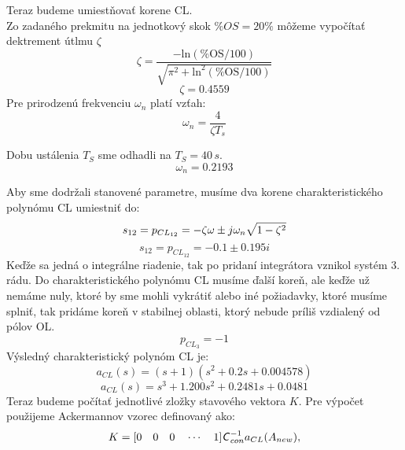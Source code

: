 \documentclass[journal]{IEEEtran}
\begin{document}
Teraz budeme umiestňovať korene CL.\\
Zo zadaného prekmitu na jednotkový skok $\%OS = 20\%$ môžeme vypočítať dektrement útlmu $\zeta$
\begin{equation}\label{eq:1}
	\zeta=\frac{-\mathrm{ln}(\%\mathrm{OS}/100)}{\sqrt{\pi^2+\mathrm{ln}^2(\%\mathrm{OS}/100)}}
\end{equation}
\begin{equation}
	\zeta=0.4559
\end{equation} 
Pre prirodzenú frekvenciu $\omega_n $ platí vzťah:
\begin{equation}
	\omega_n=\frac{4}{\zeta T_s}
\end{equation}

Dobu ustálenia $T_S$ sme odhadli na $T_S=40\,s$.
\begin{equation}
	\omega_n=0.2193
\end{equation}

Aby sme dodržali stanovené parametre, musíme dva korene charakteristického polynómu CL umiestniť do:
\begin{equation}
	s_{12}=p_{{CL}_{12}}=-\zeta\omega \pm j\omega_n\sqrt{1-\zeta^2}\\
\end{equation}
\begin{equation}
s_{12}=p_{{CL}_{12}}=-0.1\pm 0.195i 
\end{equation}
Keďže sa jedná o integrálne riadenie, tak po pridaní integrátora vznikol systém 3. rádu. Do charakteristického polynómu CL musíme ďalší koreň, ale keďže už nemáme nuly, ktoré by sme mohli vykrátiť alebo iné požiadavky, ktoré musíme splniť, tak pridáme koreň v stabilnej oblasti, ktorý nebude príliš vzdialený od pólov OL.
\begin{equation}
	p_{{CL}_{3}}=- 1
\end{equation}
Výsledný charakteristický polynóm CL je:
\begin{equation}
	a_{CL}(s)=(s+1)(s^2+0.2s+0.004578)
\end{equation}
\begin{equation}
a_{CL}(s)=s^3+1.200s^2+0.2481s+0.0481
\end{equation}
Teraz budeme počítať jednotlivé zložky stavového vektora $K$.
Pre výpočet použijeme Ackermannov vzorec definovaný ako:
\begin{equation}
	K=[0\quad0\quad 0\quad \cdots \quad  1]\textsf{\textsl{{C}}}_{con}^{-1}a_{CL}(A_{new}),
\end{equation}
\end{document}
